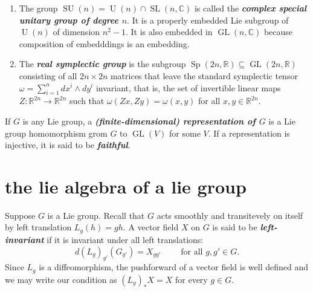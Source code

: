 \begin{example}
\begin{enumerate}
		\item The group $\operatorname{SU}(n)=\operatorname{U}(n)\cap\operatorname{SL}(n,\mathbb{C})$ is called the \textbf{\textit{complex special unitary group of degree $n$}}. It is a properly embedded Lie subgroup of $\operatorname{U}(n)$ of dimension $n^2-1$. It is also embedded in $\operatorname{GL}(n,\mathbb{C})$ because composition of embedddings is an embedding.
		\item The \textbf{\textit{real symplectic group}} is the subgroup $\operatorname{Sp}(2n,\mathbb{R})\subseteq\operatorname{GL}(2n,\mathbb{R})$ consisting of all $2n\times2n$ matrices that leave the standard symplectic tensor $\omega=\sum_{i=1}^ndx^i\wedge dy^i$ invariant, that is, the set of invertible linear maps $Z:\mathbb{R}^{2n}\to\mathbb{R}^{2n}$ such that $\omega(Zx,Zy)=\omega(x,y)$ for all $x,y\in\mathbb{R}^{2n}$.
	\end{enumerate}
\end{example}
\begin{defn}[Extra]
	If $G$ is any Lie group, a \textbf{\textit{(finite-dimensional) representation of $G$}} is a Lie group homomorphism grom $G$ to $\operatorname{GL}(V)$ for some $V$. If a representation is injective, it is said to be \textbf{\textit{faithful}}.
\end{defn}
\section{the lie algebra of a lie group}
Suppose $G$ is a Lie group. Recall that $G$ acts smoothly and transitevely on itself by left translation $L_g(h)=gh$. A vector field $X$ on $G$ is said to be \textbf{\textit{left-invariant}} if it is invariant under all left translations:
\[d(L_g)_{g'}(G_{g'})=X_{gg'}\qquad\text{ for all }g,g'\in G.\]
Since $L_g$ is a diffeomorphism, the pushforward of a vector field is well defined and we may write our condition as $(L_g)_*X=X$ for every $g\in G$.

